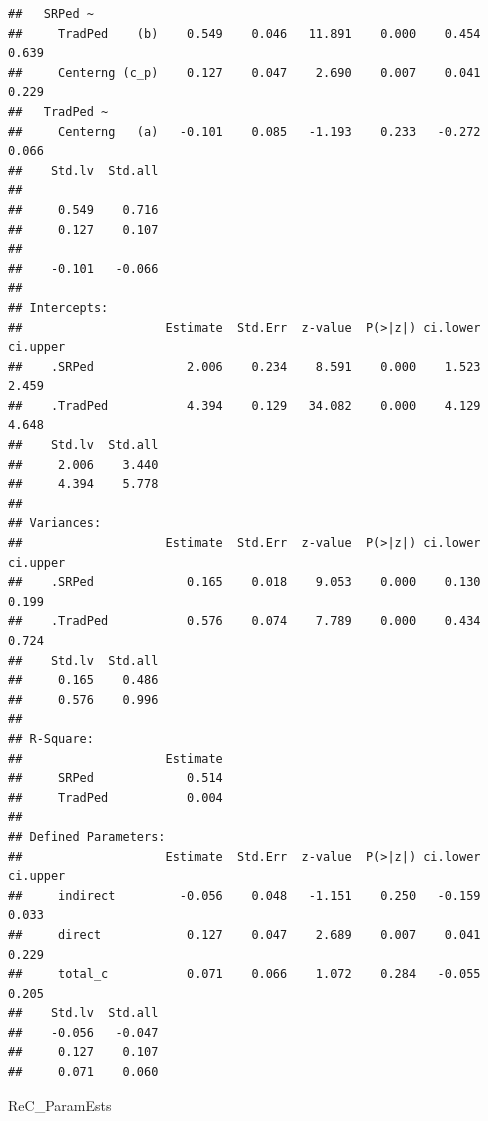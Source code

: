 \documentclass[
  11pt,
]{book}
\newenvironment{Shaded}{\begin{snugshade}}{\end{snugshade}}
\newcommand{\NormalTok}[1]{#1}
\begin{document}
\begin{verbatim}
##   SRPed ~                                                               
##     TradPed    (b)    0.549    0.046   11.891    0.000    0.454    0.639
##     Centerng (c_p)    0.127    0.047    2.690    0.007    0.041    0.229
##   TradPed ~                                                             
##     Centerng   (a)   -0.101    0.085   -1.193    0.233   -0.272    0.066
##    Std.lv  Std.all
##                   
##     0.549    0.716
##     0.127    0.107
##                   
##    -0.101   -0.066
## 
## Intercepts:
##                    Estimate  Std.Err  z-value  P(>|z|) ci.lower ci.upper
##    .SRPed             2.006    0.234    8.591    0.000    1.523    2.459
##    .TradPed           4.394    0.129   34.082    0.000    4.129    4.648
##    Std.lv  Std.all
##     2.006    3.440
##     4.394    5.778
## 
## Variances:
##                    Estimate  Std.Err  z-value  P(>|z|) ci.lower ci.upper
##    .SRPed             0.165    0.018    9.053    0.000    0.130    0.199
##    .TradPed           0.576    0.074    7.789    0.000    0.434    0.724
##    Std.lv  Std.all
##     0.165    0.486
##     0.576    0.996
## 
## R-Square:
##                    Estimate
##     SRPed             0.514
##     TradPed           0.004
## 
## Defined Parameters:
##                    Estimate  Std.Err  z-value  P(>|z|) ci.lower ci.upper
##     indirect         -0.056    0.048   -1.151    0.250   -0.159    0.033
##     direct            0.127    0.047    2.689    0.007    0.041    0.229
##     total_c           0.071    0.066    1.072    0.284   -0.055    0.205
##    Std.lv  Std.all
##    -0.056   -0.047
##     0.127    0.107
##     0.071    0.060
\end{verbatim}

\begin{Shaded}
\begin{Highlighting}[]
\NormalTok{ReC\_ParamEsts}
\end{Highlighting}
\end{Shaded}
\end{document}

